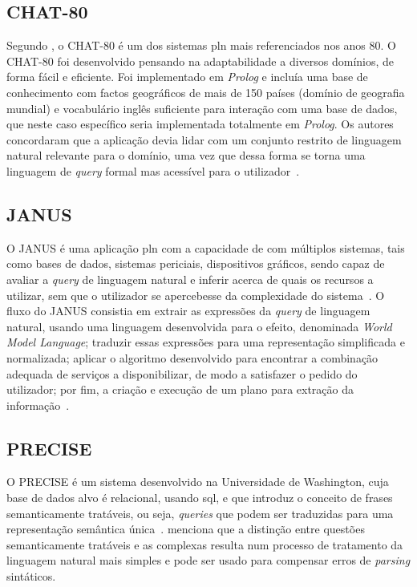 \subsection{CHAT-80}
Segundo \textcite{nlidb_brief_review}, o CHAT-80 é um dos sistemas \gls{pln} mais referenciados nos anos 80. O CHAT-80 foi desenvolvido pensando na adaptabilidade a diversos domínios, de forma fácil e eficiente. Foi implementado em \textit{Prolog} e incluía uma base de conhecimento com factos geográficos de mais de 150 países (domínio de geografia mundial) e vocabulário inglês suficiente para interação com uma base de dados, que neste caso específico seria implementada totalmente em \textit{Prolog}. Os autores concordaram que a aplicação devia lidar com um conjunto restrito de linguagem natural relevante para o domínio, uma vez que dessa forma se torna uma linguagem de \textit{query} formal mas acessível para o utilizador~\parencite{efficient_easily_adaptable_system_interpreting_nlq}.

\subsection{JANUS}
O JANUS é uma aplicação \gls{pln} com a capacidade de  com múltiplos sistemas, tais como bases de dados, sistemas periciais, dispositivos gráficos, sendo capaz de avaliar a \textit{query} de linguagem natural e inferir acerca de quais os recursos a utilizar, sem que o utilizador se apercebesse da complexidade do sistema~\parencite{nlidb_brief_review, access_multiple_underlying_system_janus}. O fluxo do JANUS consistia em extrair as expressões da \textit{query} de linguagem natural, usando uma linguagem desenvolvida para o efeito, denominada \textit{World Model Language}; traduzir essas expressões para uma representação simplificada e normalizada; aplicar o algoritmo desenvolvido para encontrar a combinação adequada de serviços a disponibilizar, de modo a satisfazer o pedido do utilizador; por fim, a criação e execução de um plano para extração da informação~\parencite{access_multiple_underlying_system_janus}.

\subsection{PRECISE}
O PRECISE é um sistema desenvolvido na Universidade de Washington, cuja base de dados alvo é relacional, usando \gls{sql}, e que introduz o conceito de frases semanticamente tratáveis, ou seja, \textit{queries} que podem ser traduzidas para uma representação semântica única~\parencite{overview_nlidb_approaches_implementation_airline, nlidb_brief_review}. \textcite{modern_nlidb_composing_statistical_parsing_semantic_tractability} menciona que a distinção entre questões semanticamente tratáveis e as complexas resulta num processo de tratamento da linguagem natural mais simples e pode ser usado para compensar erros de \textit{parsing} sintáticos. 


